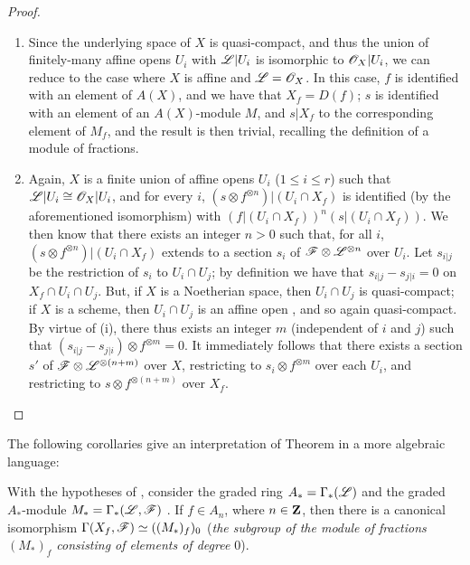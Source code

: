 \begin{proof}
\label{proof-1.9.3.1}
\medskip\noindent
\begin{enumerate}[label=(\roman*)]
  \item Since the underlying space of $X$ is quasi-compact, and thus the union of
    finitely-many affine opens $U_i$ with $\mathscr{L}|U_i$ is isomorphic to
    $\mathscr{O}_X|U_i$, we can reduce to the case where $X$ is affine and $\mathscr{L}=\mathscr{O}_X$.
    In this case, $f$ is identified with an element of $A(X)$, and we have that
    $X_f=D(f)$; $s$ is identified with an element of an $A(X)$-module $M$, and
    $s|X_f$ to the corresponding element of $M_f$, and the result is then trivial,
    recalling the definition of a module of fractions.
  \item Again, $X$ is a finite union of affine opens $U_i$ ($1\leq i\leq r$)
    such that $\mathscr{L}|U_i\cong\mathscr{O}_X|U_i$, and for every $i$,
    $(s\otimes f^{\otimes n})|(U_i\cap X_f)$ is identified (by the aforementioned
    isomorphism) with $(f|(U_i\cap X_f))^n(s|(U_i\cap X_f))$. We then know
     that there exists an integer $n>0$ such that, for all
    $i$, $(s\otimes f^{\otimes n})|(U_i\cap X_f)$ extends to a section $s_i$ of
    $\mathscr{F}\otimes\mathscr{L}^{\otimes n}$ over $U_i$. Let $s_{i|j}$ be the restriction
    of $s_i$ to $U_i\cap U_j$; by definition we have that $s_{i|j}-s_{j|i}=0$ on
    $X_f\cap U_i\cap U_j$. But, if $X$ is a Noetherian space, then $U_i\cap U_j$ is
    quasi-compact; if $X$ is a scheme, then $U_i\cap U_j$ is an affine open
    , and so again quasi-compact. By virtue of (i), there thus
    exists an integer $m$ (independent of $i$ and $j$) such that
    $(s_{i|j}-s_{j|i})\otimes f^{\otimes m}=0$. It immediately follows that there
    exists a section $s'$ of $\mathscr{F}\otimes\mathscr{L}^{\otimes(n+m)}$ over $X$,
    restricting to $s_i\otimes f^{\otimes m}$ over each $U_i$, and restricting to
    $s\otimes f^{\otimes(n+m)}$ over $X_f$.
\end{enumerate}
\end{proof}

The following corollaries give an interpretation of Theorem  in a more
algebraic language:
\begin{cor}[9.3.2]
\label{1.9.3.2}
With the hypotheses of , consider the graded ring $A_*=\Gamma_*(\mathscr{L})$
and the graded $A_*$-module $M_*=\Gamma_*(\mathscr{L},\mathscr{F})$ . If $f\in A_n$,
where $n\in\mathbf{Z}$, then there is a canonical isomorphism
$\Gamma(X_f,\mathscr{F})\simeq((M_*)_f)_0$ (\emph{the subgroup of the module of
fractions $(M_*)_f$ consisting of elements of degree $0$}).
\end{cor}


